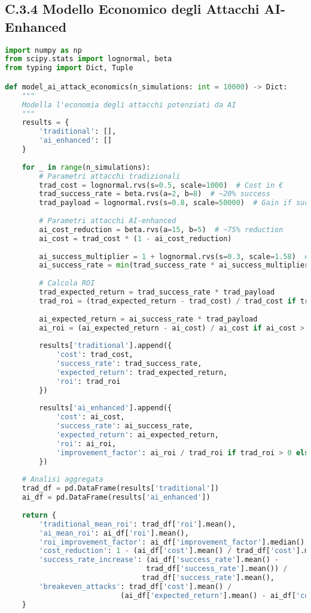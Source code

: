 \subsection{C.3.4 Modello Economico degli Attacchi AI-Enhanced}

\begin{lstlisting}[language=Python, caption=Economia degli Attacchi con AI]
import numpy as np
from scipy.stats import lognormal, beta
from typing import Dict, Tuple

def model_ai_attack_economics(n_simulations: int = 10000) -> Dict:
    """
    Modella l'economia degli attacchi potenziati da AI
    """
    results = {
        'traditional': [],
        'ai_enhanced': []
    }
    
    for _ in range(n_simulations):
        # Parametri attacchi tradizionali
        trad_cost = lognormal.rvs(s=0.5, scale=1000)  # Cost in €
        trad_success_rate = beta.rvs(a=2, b=8)  # ~20% success
        trad_payload = lognormal.rvs(s=0.8, scale=50000)  # Gain if successful
        
        # Parametri attacchi AI-enhanced
        ai_cost_reduction = beta.rvs(a=15, b=5)  # ~75% reduction
        ai_cost = trad_cost * (1 - ai_cost_reduction)
        
        ai_success_multiplier = 1 + lognormal.rvs(s=0.3, scale=1.58)  # ~2.58x
        ai_success_rate = min(trad_success_rate * ai_success_multiplier, 0.95)
        
        # Calcola ROI
        trad_expected_return = trad_success_rate * trad_payload
        trad_roi = (trad_expected_return - trad_cost) / trad_cost if trad_cost > 0 else 0
        
        ai_expected_return = ai_success_rate * trad_payload
        ai_roi = (ai_expected_return - ai_cost) / ai_cost if ai_cost > 0 else 0
        
        results['traditional'].append({
            'cost': trad_cost,
            'success_rate': trad_success_rate,
            'expected_return': trad_expected_return,
            'roi': trad_roi
        })
        
        results['ai_enhanced'].append({
            'cost': ai_cost,
            'success_rate': ai_success_rate,
            'expected_return': ai_expected_return,
            'roi': ai_roi,
            'improvement_factor': ai_roi / trad_roi if trad_roi > 0 else np.inf
        })
    
    # Analisi aggregata
    trad_df = pd.DataFrame(results['traditional'])
    ai_df = pd.DataFrame(results['ai_enhanced'])
    
    return {
        'traditional_mean_roi': trad_df['roi'].mean(),
        'ai_mean_roi': ai_df['roi'].mean(),
        'roi_improvement_factor': ai_df['improvement_factor'].median(),
        'cost_reduction': 1 - (ai_df['cost'].mean() / trad_df['cost'].mean()),
        'success_rate_increase': (ai_df['success_rate'].mean() - 
                                 trad_df['success_rate'].mean()) / 
                                trad_df['success_rate'].mean(),
        'breakeven_attacks': trad_df['cost'].mean() / 
                           (ai_df['expected_return'].mean() - ai_df['cost'].mean())
    }
\end{lstlisting}

